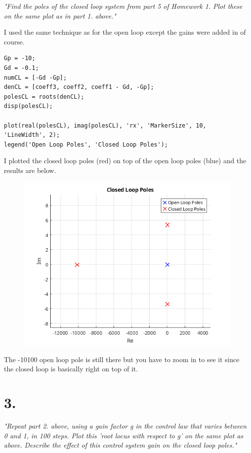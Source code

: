 \documentclass{article}
\begin{document}
\textit{
    "Find the poles of the closed loop system from part 5 of Homework 1. Plot these on the same
    plot as in part 1. above."
}

I used the same technique as for the open loop except the gains were added in of course.

\begin{lstlisting}[style=matlabstyle]    
Gp = -10;
Gd = -0.1;
numCL = [-Gd -Gp];
denCL = [coeff3, coeff2, coeff1 - Gd, -Gp];
polesCL = roots(denCL);
disp(polesCL);

plot(real(polesCL), imag(polesCL), 'rx', 'MarkerSize', 10, 'LineWidth', 2);
legend('Open Loop Poles', 'Closed Loop Poles');
\end{lstlisting}

I plotted the closed loop poles (red) on top of the open loop poles (blue) and the results are below.

\begin{figure}[H]
    \centering
    \includegraphics[width=\textwidth]{closedPoles.png}
\end{figure}

The -10100 open loop pole is still there but you have to zoom in to see it since the closed loop is basically right on top of it.
    
\section*{3.}

\textit{
    "Repeat part 2. above, using a gain factor g in the control law that varies between 0 and 1, in
    100 steps. Plot this 'root locus with respect to g' on the same plot as above. Describe the
    effect of this control system gain on the closed loop poles."
}
\end{document}
